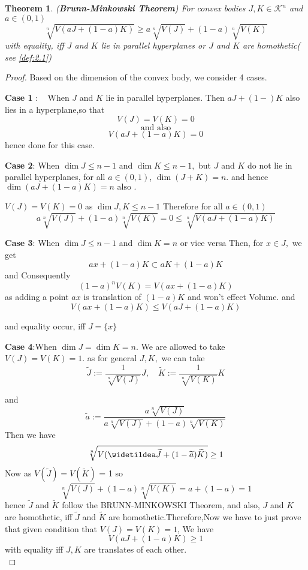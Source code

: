 \documentclass[oneside]{book}
\newtheorem{theorem}{Theorem}[section]
\begin{document}
 
 \begin{theorem}(\textbf{Brunn-Minkowski Theorem})
 \label{thm:20}
For convex bodies $J, K \in \mathcal{K}^{n}$ and $a \in(0,1)$
\begin{equation}
\sqrt[n]{V(a J+(1-a) K)} \geq a \sqrt[n]{V(J)}+(1-a) \sqrt[n]{V(K)}
\end{equation} \label{eq:4.19}
with equality, iff $J$ and $K$ lie in parallel hyperplanes or $J$ and $K$ are homothetic( see \ref{def:2.1})
  \end{theorem}
\begin{proof}


Based on the dimension of the convex body, we consider 4 cases.
 \hfill \break
 
\textbf{Case 1} $: \quad \text{When } J$ and $K$ lie in parallel hyperplanes. Then  $a J+(1-) K$  also lies in a hyperplane,\quad so that $$V(J)=V(K)=0$$    $$\text{and also}$$ $$V(a J+(1-a) K)=0$$
 hence done for this case.

 \hfill \break
\textbf{Case 2}: \quad  When $\operatorname{dim} J \leq n-1$ and $\operatorname{dim} K \leq n-1,$ but $J$ and $K$ do not lie in parallel hyperplanes, for all $a \in(0,1)$, $\operatorname{dim}(J+K)=n .$ and hence  $\operatorname{dim}(a J+(1-a) K)=n \text{ also }.$ 

\hfill \break
$V(J) = V(K)= 0$ as $\operatorname{dim} J,K \leq n-1 $ Therefore for all $a \in(0,1)$
 $$
a \sqrt[n]{V(J)}+(1-a) \sqrt[n]{V(K)}=0 \leq \sqrt[n]{V(a J+(1-a) K)}
$$

\hfill \break
\textbf{Case 3}: \quad  When $\operatorname{dim } J \leq n-1$ and $\operatorname{dim} K=n$ or vice versa
\hfill \break 
Then, for $x \in J,$ we get
\[
a x+(1-a) K \subset a K+(1-a) K
\]
and Consequently
\[
(1-a)^{n} V(K)=V(a x+(1-a) K) 
\]
as adding a point $a x $ is translation of $(1-a) K$ and won't effect Volume. 
and
$$ V(a x+(1-a) K) \leq V(a 
J+(1-a) K)$$

and equality occur, iff $J=\{x\}$ 

\hfill \break
\textbf{Case 4}:When $\operatorname{dim} J=\operatorname{dim} K=n .$  We are allowed to take $V(J)=V(K)=1 .$ as for general $J, K,$  we  can take
\[
  \widetilde{J}:=\frac{1}{\sqrt[n]{V(J)}} J, \quad \widetilde{K}:=\frac{1}{\sqrt[n]{V(K)}} K
\]

and
\[
\widetilde{a}:=\frac{a \sqrt[n]{V(J)}}{a \sqrt[n]{V(J)}+(1-a) \sqrt[n]{V(K)}}
\]
Then we have
\[
    \sqrt[n]{V({\widetildea \widetilde{ J} }+(1-\widetilde{a}) \widetilde{K})} \geq 1
\]
Now  as $V(\widetilde{J}) = V(\widetilde{K})$ = 1 so $$\sqrt[n]{V(J)}+(1-a) \sqrt[n]{V(K)}=a+(1-a)=1$$
hence $\widetilde{J}$ and $\widetilde{K}$
follow the BRUNN-MINKOWSKI Theorem,  and also, $J$ and $K$ are homothetic, iff $\widetilde{J}$ and $\widetilde{K}$ are homothetic.Therefore,Now  we have to just prove that given condition that $V(J)=V(K)=1$, We have 
\[
V(a J+(1-a) K) \geq 1
\]
with equality iff $J, K$ are translates of each other.
\\


\end{proof}
\end{document}
